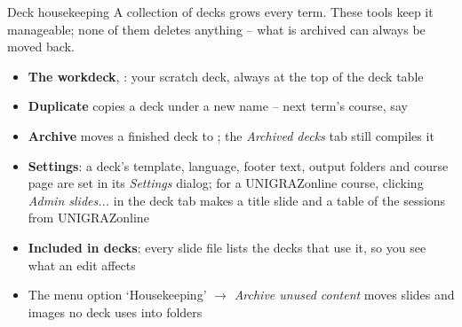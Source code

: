 
\begin{standardframe}{Deck housekeeping}
	\small
	A collection of decks grows every term. These tools keep it manageable;
	none of them deletes anything -- what is archived can always be moved back.
	\par\medskip
	\begin{itemize}
		\item \textbf{The workdeck}, : your scratch deck, always at the top of the deck table
		\item \textbf{Duplicate} copies a deck under a new name -- next term's course, say
		\item \textbf{Archive} moves a finished deck to ; the \emph{Archived decks} tab still compiles it
		\item \textbf{Settings}: a deck's template, language, footer text, output folders and course page are set in its \emph{Settings} dialog; for a UNIGRAZonline course, clicking \emph{Admin slides...} in the deck tab makes a title slide and a table of the sessions from UNIGRAZonline
		\item \textbf{Included in decks}: every slide file lists the decks that use it, so you see what an edit affects
		\item The menu option `Housekeeping' $\rightarrow$ \emph{Archive unused content} moves slides and images no deck uses into  folders
	\end{itemize}
\end{standardframe}

